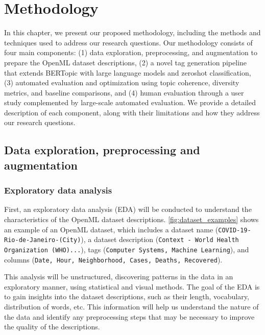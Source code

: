 \chapter{Methodology}
\label{chapter:methodology}
In this chapter, we present our proposed methodology, including the methods and techniques used to address our research questions. Our methodology consists of four main components: (1) data exploration, preprocessing, and augmentation to prepare the OpenML dataset descriptions, (2) a novel tag generation pipeline that extends BERTopic with large language models and zeroshot classification, (3) automated evaluation and optimization using topic coherence, diversity metrics, and baseline comparisons, and (4) human evaluation through a user study complemented by large-scale automated evaluation. We provide a detailed description of each component, along with their limitations and how they address our research questions.

\section{Data exploration, preprocessing and augmentation}
\label{sec:data_exploration}
\subsection{Exploratory data analysis}
First, an exploratory data analysis (EDA) will be conducted to understand the characteristics of the OpenML dataset descriptions. \cref{fig:dataset_examples} shows an example of an OpenML dataset, which includes a dataset name (\texttt{COVID-19-Rio-de-Janeiro-(City)}), a dataset description (\texttt{Context - World Health Organization (WHO)...}), tags (\texttt{Computer Systems, Machine Learning}), and columns (\texttt{Date, Hour, Neighborhood, Cases, Deaths, Recovered}).

This analysis will be unstructured, discovering patterns in the data in an exploratory manner, using statistical and visual methods. The goal of the EDA is to gain insights into the dataset descriptions, such as their length, vocabulary, distribution of words, etc. This information will help us understand the nature of the data and identify any preprocessing steps that may be necessary to improve the quality of the descriptions.

